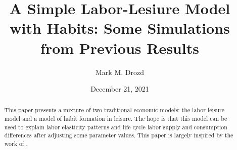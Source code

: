 \documentclass[ProjectMMD]{subfiles}
\begin{document}
\providecommand{\versn}{pdf} %
\ifthenelse{\boolean{Web}}{    %
  \renewcommand{\versn}{Web}     %
  \renewcommand{\rootFromOut}{.} %
}{}  %


\title{A Simple Labor-Lesiure Model with Habits: Some Simulations from Previous Results }

\author{Mark M. Drozd \authNum}


\renewcommand{\forcedate}{December 21, 2021}\date{\forcedate}

\maketitle
\hypertarget{abstract}{}
\begin{abstract}
  This paper presents a mixture of two traditional economic models: the labor-leisure model and a model of habit formation in leisure. The hope is that this model can be used to explain labor elasticity patterns and life cycle labor supply and consumption differences after adjusting some parameter values. This paper is largely inspired by the work of \cite{bover1991relaxing}.
\end{abstract}


\hypertarget{links}{}
\end{document}
